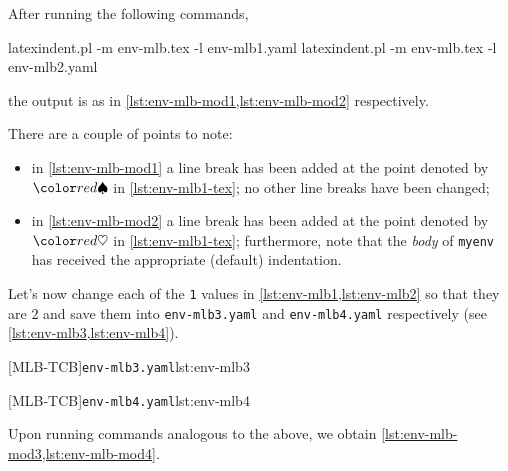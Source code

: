 	After running the following commands,
	\begin{commandshell}
latexindent.pl -m env-mlb.tex -l env-mlb1.yaml
latexindent.pl -m env-mlb.tex -l env-mlb2.yaml
\end{commandshell}
	the output is as in \cref{lst:env-mlb-mod1,lst:env-mlb-mod2} respectively.

	\begin{widepage}
		\begin{minipage}{.57\linewidth}
		\end{minipage}
		\hfill
		\begin{minipage}{.42\linewidth}
		\end{minipage}
	\end{widepage}

	There are a couple of points to note:
	\begin{itemize}
		\item in \cref{lst:env-mlb-mod1} a line break has been added at the point denoted by $\BeginStartsOnOwnLine$ in \cref{lst:env-mlb1-tex}; no
		      other line breaks have been changed;
		\item in \cref{lst:env-mlb-mod2} a line break has been added at the point denoted by $\BodyStartsOnOwnLine$ in \cref{lst:env-mlb1-tex};
		      furthermore, note that the \emph{body} of \texttt{myenv} has received the appropriate (default) indentation.
	\end{itemize}

	Let's now change each of the \texttt{1} values in \cref{lst:env-mlb1,lst:env-mlb2} so that they are $2$ and
	save them into \texttt{env-mlb3.yaml} and \texttt{env-mlb4.yaml} respectively (see \cref{lst:env-mlb3,lst:env-mlb4}).

	\begin{minipage}{.45\textwidth}
		[MLB-TCB]{\texttt{env-mlb3.yaml}}{lst:env-mlb3}
	\end{minipage}
	\hfill
	\begin{minipage}{.45\textwidth}
		[MLB-TCB]{\texttt{env-mlb4.yaml}}{lst:env-mlb4}
	\end{minipage}

	Upon running  commands analogous to the above, we obtain \cref{lst:env-mlb-mod3,lst:env-mlb-mod4}.

